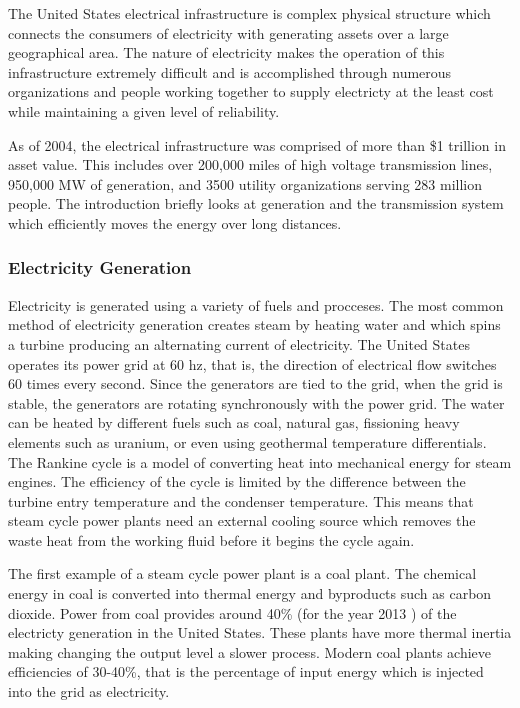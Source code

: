 The United States electrical infrastructure is complex physical structure which connects the consumers of electricity with generating assets over a large geographical area.  The nature of electricity makes the operation of this infrastructure extremely difficult and is accomplished through numerous organizations and people working together to supply electricty at the least cost while maintaining a given level of reliability.

	As of 2004, the electrical infrastructure was comprised of more than \$1 trillion in asset value.  This includes over 200,000 miles of high voltage transmission lines, 950,000 MW of generation, and 3500 utility organizations serving 283 million people.\cite{northeast_2003}  The introduction briefly looks at generation and the transmission system which efficiently moves the energy over long distances.

\subsubsection{Electricity Generation}
	Electricity is generated using a variety of fuels and procceses.  The most common method of electricity generation creates steam by heating water and which spins a turbine producing an alternating current of electricity.  The United States operates its power grid at 60 hz, that is, the direction of electrical flow switches 60 times every second.  Since the generators are tied to the grid, when the grid is stable, the generators are rotating synchronously with the power grid.  The water can be heated by different fuels such as coal, natural gas, fissioning heavy elements such as uranium, or even using geothermal temperature differentials.  The Rankine cycle is a model of converting heat into mechanical energy for steam engines.  The efficiency of the cycle is limited by the difference between the turbine entry temperature and the condenser temperature.  This means that steam cycle power plants need an external cooling source which removes the waste heat from the working fluid before it begins the cycle again.  

	The first example of a steam cycle power plant is a coal plant.  The chemical energy in coal is converted into thermal energy and byproducts such as carbon dioxide.  Power from coal provides around 40\% (for the year 2013 \cite{eia_gov}) of the electricty generation in the United States. These plants have more thermal inertia making changing the output level a slower process.  Modern coal plants achieve efficiencies of 30-40\%, that is the percentage of input energy which is injected into the grid as electricity.

